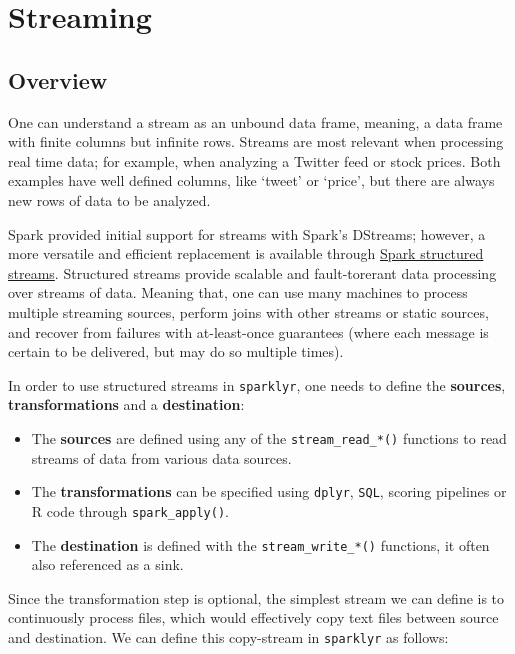\documentclass[]{book}
\providecommand{\tightlist}{%
  \setlength{\itemsep}{0pt}\setlength{\parskip}{0pt}}
\theoremstyle{definition}
\theoremstyle{definition}
\theoremstyle{definition}
\theoremstyle{remark}
\begin{document}
\hypertarget{streaming}{%
\chapter{Streaming}\label{streaming}}

\hypertarget{overview-4}{%
\section{Overview}\label{overview-4}}

One can understand a stream as an unbound data frame, meaning, a data
frame with finite columns but infinite rows. Streams are most relevant
when processing real time data; for example, when analyzing a Twitter
feed or stock prices. Both examples have well defined columns, like
`tweet' or `price', but there are always new rows of data to be
analyzed.

Spark provided initial support for streams with Spark's DStreams;
however, a more versatile and efficient replacement is available through
\href{https://spark.apache.org/docs/latest/structured-streaming-programming-guide.html}{Spark
structured streams}. Structured streams provide scalable and
fault-torerant data processing over streams of data. Meaning that, one
can use many machines to process multiple streaming sources, perform
joins with other streams or static sources, and recover from failures
with at-least-once guarantees (where each message is certain to be
delivered, but may do so multiple times).

In order to use structured streams in \texttt{sparklyr}, one needs to
define the \textbf{sources}, \textbf{transformations} and a
\textbf{destination}:

\begin{itemize}
\tightlist
\item
  The \textbf{sources} are defined using any of the
  \texttt{stream\_read\_*()} functions to read streams of data from
  various data sources.
\item
  The \textbf{transformations} can be specified using \texttt{dplyr},
  \texttt{SQL}, scoring pipelines or R code through
  \texttt{spark\_apply()}.
\item
  The \textbf{destination} is defined with the
  \texttt{stream\_write\_*()} functions, it often also referenced as a
  sink.
\end{itemize}

Since the transformation step is optional, the simplest stream we can
define is to continuously process files, which would effectively copy
text files between source and destination. We can define this
copy-stream in \texttt{sparklyr} as follows:
\end{document}
